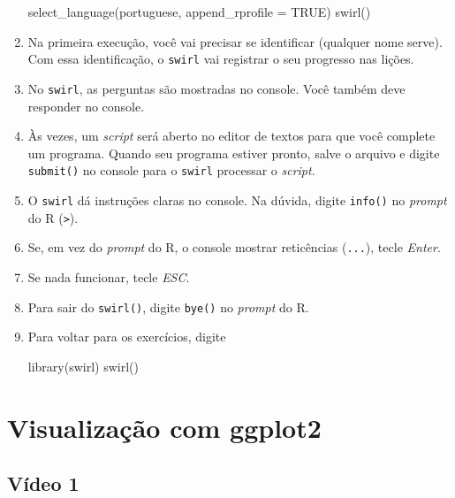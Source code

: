 \documentclass[
  12pt]{report}
\newenvironment{Shaded}{\begin{snugshade}}{\end{snugshade}}
\newcommand{\AttributeTok}[1]{\textcolor[rgb]{0.77,0.63,0.00}{#1}}
\newcommand{\ConstantTok}[1]{\textcolor[rgb]{0.00,0.00,0.00}{#1}}
\newcommand{\FunctionTok}[1]{\textcolor[rgb]{0.00,0.00,0.00}{#1}}
\newcommand{\NormalTok}[1]{#1}
\newcommand{\StringTok}[1]{\textcolor[rgb]{0.31,0.60,0.02}{#1}}
\begin{document}
\begin{enumerate}
\begin{Shaded}
\begin{Highlighting}[]
\FunctionTok{select\_language}\NormalTok{(}\StringTok{\textquotesingle{}portuguese\textquotesingle{}}\NormalTok{, }\AttributeTok{append\_rprofile =} \ConstantTok{TRUE}\NormalTok{)}
\FunctionTok{swirl}\NormalTok{()}
\end{Highlighting}
\end{Shaded}
\item
  Na primeira execução, você vai precisar se identificar (qualquer nome serve). Com essa identificação, o \texttt{swirl} vai registrar o seu progresso nas lições.
\item
  No \texttt{swirl}, as perguntas são mostradas no console. Você também deve responder no console.
\item
  Às vezes, um \emph{script} será aberto no editor de textos para que você complete um programa. Quando seu programa estiver pronto, salve o arquivo e digite \texttt{submit()} no console para o \texttt{swirl} processar o \emph{script}.
\item
  O \texttt{swirl} dá instruções claras no console. Na dúvida, digite \texttt{info()} no \emph{prompt} do R (\texttt{\textgreater{}}).
\item
  Se, em vez do \emph{prompt} do R, o console mostrar reticências (\texttt{...}), tecle \emph{Enter}.
\item
  Se nada funcionar, tecle \emph{ESC}.
\item
  Para sair do \texttt{swirl()}, digite \texttt{bye()} no \emph{prompt} do R.
\item
  Para voltar para os exercícios, digite

\begin{Shaded}
\begin{Highlighting}[]
\FunctionTok{library}\NormalTok{(swirl)}
\FunctionTok{swirl}\NormalTok{()}
\end{Highlighting}
\end{Shaded}
\end{enumerate}

\hypertarget{viz}{%
\chapter{Visualização com ggplot2}\label{viz}}

\hypertarget{vuxeddeo-1-2}{%
\section{Vídeo 1}\label{vuxeddeo-1-2}}
\end{document}
